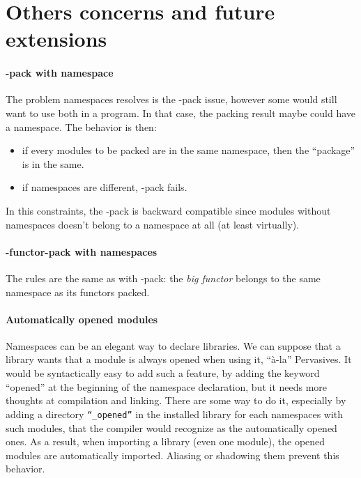 \documentclass[11pt,a4paper]{article}
\begin{document}
\section{Others concerns and future extensions}

\paragraph{-pack with namespace}

The problem namespaces resolves is the -pack issue, however some would still
want to use both in a program. In that case, the packing result maybe could have
a namespace. The behavior is then:
\begin{itemize}
\item if every modules to be packed are in the same namespace, then the
  ``package'' is in the same.
\item if namespaces are different, -pack fails.
\end{itemize}

In this constraints, the -pack is backward compatible since modules without
namespaces doesn't belong to a namespace at all (at least virtually).

\paragraph{-functor-pack with namespaces}

The rules are the same as with -pack: the \emph{big functor} belongs to the same
namespace as its functors packed.

\paragraph{Automatically opened modules}

Namespaces can be an elegant way to declare libraries. We can suppose that a
library wants that a module is always opened when using it, ``à-la''
Pervasives. It would be syntactically easy to add such a feature, by adding the
keyword ``opened'' at the beginning of the namespace declaration, but it needs
more thoughts at compilation and linking. There are some way to do it,
especially by adding a directory \texttt{``\_opened''} in the installed library
for each namespaces with such modules, that the compiler would recognize as the
automatically opened ones. As a result, when importing a library (even one
module), the opened modules are automatically imported. Aliasing or shadowing
them prevent this behavior.
\end{document}
